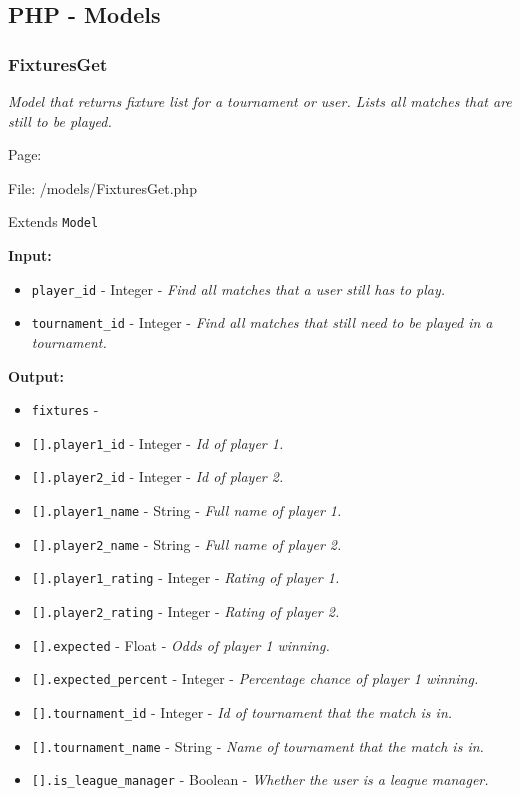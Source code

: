 \subsection{PHP - Models}
\subsubsection{FixturesGet}\label{FixturesGet.php.doc}
\textit{Model that returns fixture list for a tournament or user.
Lists all matches that are still to be played.}

Page: \pageref{FixturesGet.php}

File: /models/FixturesGet.php

Extends \texttt{Model}

\textbf{Input:}
\begin{itemize}
\item \texttt{player\_id} - Integer - \textit{Find all matches that a user still has to play.}
\item \texttt{tournament\_id} - Integer - \textit{Find all matches that still need to be played in a tournament.}
\end{itemize}

\textbf{Output:}
\begin{itemize}
\item \texttt{fixtures} - 
\item \texttt{[].player1\_id} - Integer - \textit{Id of player 1.}
\item \texttt{[].player2\_id} - Integer - \textit{Id of player 2.}
\item \texttt{[].player1\_name} - String - \textit{Full name of player 1.}
\item \texttt{[].player2\_name} - String - \textit{Full name of player 2.}
\item \texttt{[].player1\_rating} - Integer - \textit{Rating of player 1.}
\item \texttt{[].player2\_rating} - Integer - \textit{Rating of player 2.}
\item \texttt{[].expected} - Float - \textit{Odds of player 1 winning.}
\item \texttt{[].expected\_percent} - Integer - \textit{Percentage chance of player 1 winning.}
\item \texttt{[].tournament\_id} - Integer - \textit{Id of tournament that the match is in.}
\item \texttt{[].tournament\_name} - String - \textit{Name of tournament that the match is in.}
\item \texttt{[].is\_league\_manager} - Boolean - \textit{Whether the user is a league manager.}
\end{itemize}

